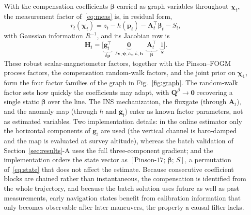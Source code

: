 \documentclass{IEEEtaes}
\begin{document}
With the compensation coefficients $\boldsymbol{\beta}$ carried as graph variables
throughout $\boldsymbol{\chi}_t$, the measurement factor of~\eqref{eq:meas} is, in
residual form,
\begin{equation}
r_t(\boldsymbol{\chi}_t)=z_t-h(\mathbf{p}_t)-\mathbf{A}_t^{\top}\boldsymbol{\beta}_t-S_t,
\label{eq:resid}
\end{equation}
with Gaussian information $R^{-1}$, and its Jacobian row is
\begin{equation}
\mathbf{H}_t=\Big[\underbrace{\mathbf{g}_t^{\top}}_{\delta\mathbf{p}}\;\;
\underbrace{\mathbf{0}}_{\delta\mathbf{v},\boldsymbol{\psi},h_a,\hat{a},\mathbf{b}}\;\;
\underbrace{\mathbf{A}_t^{\top}}_{\boldsymbol{\beta}}\;\;
\underbrace{1}_{S}\Big].
\label{eq:jac}
\end{equation}
These robust scalar-magnetometer factors, together with the Pinson--FOGM process
factors, the compensation random-walk factors, and the joint prior on
$\boldsymbol{\chi}_1$, form the four factor families of the graph in
Fig.~\ref{fig:graph}. The random-walk factor sets how quickly the coefficients may
adapt, with $\mathbf{Q}^{\beta}\!\to\!\mathbf{0}$ recovering a single static
$\boldsymbol{\beta}$ over the line.
The INS mechanization, the fluxgate (through $\mathbf{A}_t$), and the anomaly map
(through $h$ and $\mathbf{g}_t$) enter as known factor parameters, not as
estimated variables. Two
implementation details: in the online estimator only the horizontal components of
$\mathbf{g}_t$ are used (the vertical channel is baro-damped and the map is
evaluated at survey altitude), whereas the batch validation of
Section~\ref{sec:results}-A uses the full three-component gradient; and the
implementation orders the state vector as
$[\text{Pinson-17};\,\boldsymbol{\beta};\,S]$, a permutation of~\eqref{eq:state}
that does not affect the estimate.
Because consecutive coefficient blocks are chained rather than instantaneous,
the compensation is identified from the whole trajectory, and because the batch
solution uses future as well as past measurements, early navigation states benefit
from calibration information that only becomes observable after later
maneuvers, the property a causal filter lacks.
\end{document}
